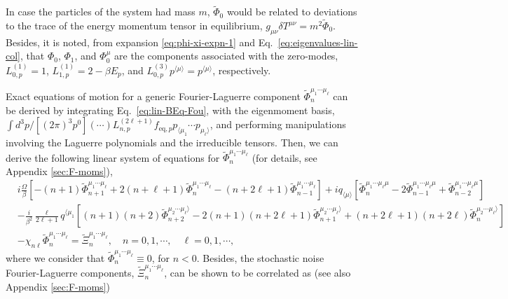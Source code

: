 \documentclass[aps,prd,preprint,nofootinbib,amsmath,amssymb,showpacs,longbibliography,singlecolumn,superscriptaddress,10pt]{revtex4-1}
\theoremstyle{plain}
\theoremstyle{definition}
\begin{document}
%
In case the particles of the system had mass $m$,  $\widetilde{\Phi}_{0}$ would be related to deviations to the trace of the energy momentum tensor in equilibrium, $g_{\mu\nu} \delta T^{\mu \nu} = m^{2} \widetilde{\Phi}_{0}$. Besides, it is noted, from expansion \eqref{eq:phi-xi-expn-1} and Eq.~\eqref{eq:eigenvalues-lin-col}, that $\Phi_{0}$, $\Phi_{1}$, and $\Phi_{0}^{\mu}$ are the components associated with the zero-modes, $L^{(1)}_{0,p} = 1$, $L^{(1)}_{1,p} = 2 - \beta E_{p}$, and $L^{(3)}_{0,p} p^{\langle \mu \rangle} = p^{\langle \mu \rangle}$, respectively. 

Exact equations of motion for a generic Fourier-Laguerre component  $\widetilde{\Phi}_{n}^{\mu_{1} \cdots \mu_{\ell}}$ can be derived by integrating Eq.~\eqref{eq:lin-BEq-Fou}, with the eigenmoment basis, $\int d^3 p/[(2\pi)^3 p^0] (\cdots) L_{n,p}^{(2 \ell +1)} f_{\mathrm{eq},p} p_{\langle \mu_{1}} \cdots p_{ \mu_{\ell} \rangle}$, and performing manipulations involving the Laguerre polynomials and the irreducible tensors. Then, we can derive the following linear system of equations for $\widetilde{\Phi}_{n}^{\mu_{1} \cdots \mu_{\ell}}$ (for details, see Appendix \ref{sec:F-moms}),
%
\begin{equation}
\label{eq:moments-lag-main}
\begin{aligned}
&
i \frac{\Omega}{\beta} \left[
-(n+1) \widetilde{\Phi}_{n+1}^{\mu_{1} \cdots \mu_{\ell}}
+
2(n+\ell+1)
\widetilde{\Phi}_{n}^{\mu_{1} \cdots \mu_{\ell}}
-
(n+2\ell+1)
\widetilde{\Phi}_{n-1}^{\mu_{1} \cdots \mu_{\ell}}
\right]
+ 
i q_{\langle \mu \rangle} \left[ \widetilde{\Phi}_{n}^{\mu_{1} \cdots \mu_{\ell} \mu}
-
2 \widetilde{\Phi}_{n-1}^{\mu_{1} \cdots \mu_{\ell} \mu}
+
\widetilde{\Phi}_{n-2}^{\mu_{1} \cdots \mu_{\ell} \mu}
\right]
\\
&
-
\frac{i}{\beta^{2}}  
 \frac{\ell}{2 \ell + 1}
q^{\langle \mu_{1}} 
\left[
(n+1)(n+2)
\widetilde{\Phi}_{n+2}^{\mu_{2} \cdots \mu_{\ell} \rangle}
-
2(n+1)(n+2\ell+1)
\widetilde{\Phi}_{n+1}^{\mu_{2} \cdots \mu_{\ell} \rangle}
+
(n+2\ell+1)(n+2\ell)
\widetilde{\Phi}_{n}^{\mu_{2} \cdots \mu_{\ell} \rangle}
\right]
\\
&
-
\chi_{n\ell}
\widetilde{\Phi}_{n}^{\mu_{1} \cdots \mu_{\ell}}
   = 
\widetilde{\Xi}_{n}^{\mu_{1} \cdots \mu_{\ell}},
%
\quad n = 0, 1, \cdots, \quad \ell = 0, 1, \cdots, 
\end{aligned}
\end{equation}
%
where we consider that $\widetilde{\Phi}_{n}^{\mu_{1} \cdots \mu_{\ell}} \equiv 0$, for $n < 0$. Besides, the stochastic noise Fourier-Laguerre components, $\widetilde{\Xi}_{n}^{\mu_{1} \cdots \mu_{\ell}}$, can be shown to be correlated as (see also Appendix \ref{sec:F-moms})
\end{document}
